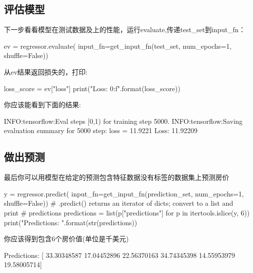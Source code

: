 \subsection{评估模型}
下一步看看模型在测试数据及上的性能，运行evaluate,传递test\_set到input\_fn：
\begin{python}
ev = regressor.evaluate(
    input_fn=get_input_fn(test_set, num_epochs=1, shuffle=False))
\end{python}
从ev结果返回损失的，打印:
\begin{python}
loss_score = ev["loss"]
print("Loss: {0:f}".format(loss_score))
\end{python}
你应该能看到下面的结果:
\begin{python}
INFO:tensorflow:Eval steps [0,1) for training step 5000.
INFO:tensorflow:Saving evaluation summary for 5000 step: loss = 11.9221
Loss: 11.92209
\end{python}
\subsection{做出预测}
最后你可以用模型在给定的预测包含特征数据没有标签的数据集上预测房价
\begin{python}
y = regressor.predict(
    input_fn=get_input_fn(prediction_set, num_epochs=1, shuffle=False))
# .predict() returns an iterator of dicts; convert to a list and print
# predictions
predictions = list(p["predictions"] for p in itertools.islice(y, 6))
print("Predictions: {}".format(str(predictions))
\end{python}
你应该得到包含6个房价值(单位是千美元)
\begin{python}
Predictions: [ 33.30348587  17.04452896  22.56370163  34.74345398  14.55953979
  19.58005714]
\end{python}